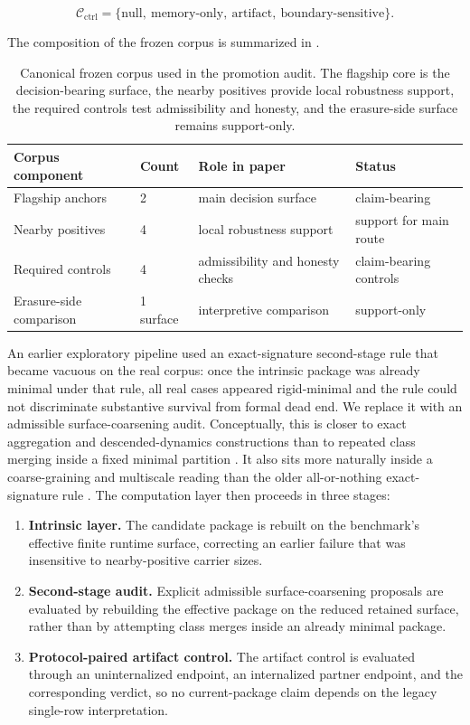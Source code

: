 \documentclass[11pt]{article}
\theoremstyle{definition}
\begin{document}
\[
\mathcal C_{\mathrm{ctrl}}
=
\{\text{null},\ \text{memory-only},\ \text{artifact},\ \text{boundary-sensitive}\}.
\]

The composition of the frozen corpus is summarized in .

\begin{table}[t]
\centering
\caption{Canonical frozen corpus used in the promotion audit. The flagship core is the decision-bearing surface, the nearby positives provide local robustness support, the required controls test admissibility and honesty, and the erasure-side surface remains support-only.}
\label{tab:main-corpus-overview}
\begin{tabularx}{\linewidth}{@{}l l >{\raggedright\arraybackslash}X l@{}}
\hline
Corpus component & Count & Role in paper & Status \\
\hline
Flagship anchors & 2 & main decision surface & claim-bearing \\
Nearby positives & 4 & local robustness support & support for main route \\
Required controls & 4 & admissibility and honesty checks & claim-bearing controls \\
Erasure-side comparison & 1 surface & interpretive comparison & support-only \\
\hline
\end{tabularx}
\end{table}
 
An earlier exploratory pipeline used an exact-signature second-stage rule that became vacuous on the real corpus: once the intrinsic package was already minimal under that rule, all real cases appeared rigid-minimal and the rule could not discriminate substantive survival from formal dead end. We replace it with an admissible surface-coarsening audit. Conceptually, this is closer to exact aggregation and descended-dynamics constructions than to repeated class merging inside a fixed minimal partition \citep{KemenySnell1960,RogersPitman1981,Buchholz1994}. It also sits more naturally inside a coarse-graining and multiscale reading than the older all-or-nothing exact-signature rule \citep{Kadanoff1966,Wilson1971}. The computation layer then proceeds in three stages:

\begin{enumerate}[label=(\roman*)]
\item \textbf{Intrinsic layer.} The candidate package is rebuilt on the benchmark's effective finite runtime surface, correcting an earlier failure that was insensitive to nearby-positive carrier sizes.
\item \textbf{Second-stage audit.} Explicit admissible surface-coarsening proposals are evaluated by rebuilding the effective package on the reduced retained surface, rather than by attempting class merges inside an already minimal package.
\item \textbf{Protocol-paired artifact control.} The artifact control is evaluated through an uninternalized endpoint, an internalized partner endpoint, and the corresponding verdict, so no current-package claim depends on the legacy single-row interpretation.
\end{enumerate}
\end{document}
